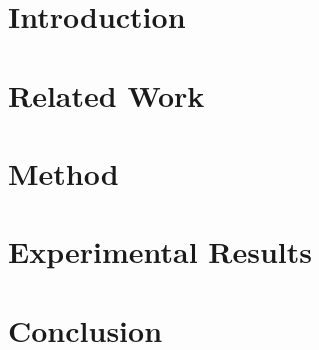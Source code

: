 


\chapter{Introduction} \label{ch:1-introduction}


\chapter{Related Work} \label{ch:2-related-works}



\chapter{Method} \label{ch:3-method}



\chapter{Experimental Results} \label{ch:4-results}
% 
% 
% 

\chapter{Conclusion} \label{ch:5-conclusion}
% 

